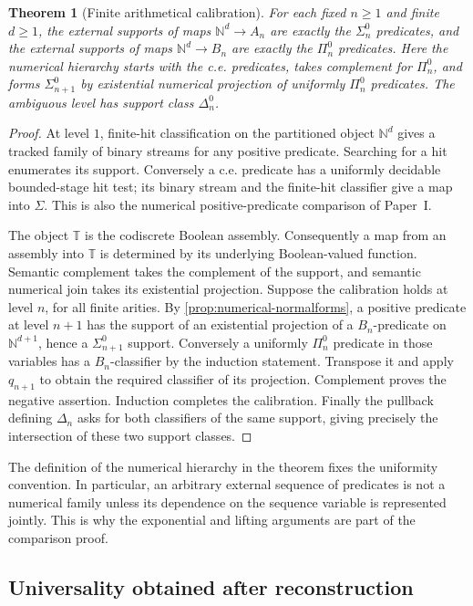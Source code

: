 \documentclass[11pt,a4paper]{article}
\numberwithin{equation}{section}
\newtheorem{theorem}{Theorem}[section]
\theoremstyle{definition}
\theoremstyle{remark}
\theoremstyle{plain}
\newcommand{\N}{\mathbb N}
\newcommand{\TV}{\mathbb T}
\begin{document}
\begin{theorem}[Finite arithmetical calibration]
\label{thm:arithmetical-calibration}
For each fixed $n\geq1$ and finite $d\geq1$, the external supports
of maps $\N^d\to A_n$ are exactly the $\Sigma^0_n$ predicates, and
the external supports of maps $\N^d\to B_n$ are exactly the
$\Pi^0_n$ predicates. Here the numerical hierarchy starts with the
c.e. predicates, takes complement for $\Pi^0_n$, and forms
$\Sigma^0_{n+1}$ by existential numerical projection of uniformly
$\Pi^0_n$ predicates. The ambiguous level has support class
$\Delta^0_n$.
\end{theorem}
\begin{proof}
At level $1$, finite-hit classification on the partitioned object
$\N^d$ gives a tracked family of binary streams for any positive
predicate. Searching for a hit enumerates its support. Conversely a
c.e. predicate has a uniformly decidable bounded-stage hit test; its
binary stream and the finite-hit classifier give a map into $\Sigma$.
This is also the numerical positive-predicate comparison of Paper~I.

The object $\TV$ is the codiscrete Boolean assembly. Consequently a
map from an assembly into $\TV$ is determined by its underlying
Boolean-valued function. Semantic complement takes the complement of
the support, and semantic numerical join takes its existential
projection. Suppose the calibration holds at level $n$, for all finite
arities. By \cref{prop:numerical-normalforms}, a positive predicate
at level $n+1$ has the support of an existential projection of a
$B_n$-predicate on $\N^{d+1}$, hence a $\Sigma^0_{n+1}$ support.
Conversely a uniformly $\Pi^0_n$ predicate in those variables has a
$B_n$-classifier by the induction statement. Transpose it and apply
$q_{n+1}$ to obtain the required classifier of its projection.
Complement proves the negative assertion. Induction completes the
calibration. Finally the pullback defining $\Delta_n$ asks for both
classifiers of the same support, giving precisely the intersection
of these two support classes.
\end{proof}

The definition of the numerical hierarchy in the theorem fixes the
uniformity convention. In particular, an arbitrary external sequence
of predicates is not a numerical family unless its dependence on the
sequence variable is represented jointly. This is why the exponential
and lifting arguments are part of the comparison proof.

\subsection{Universality obtained after reconstruction}
\end{document}
